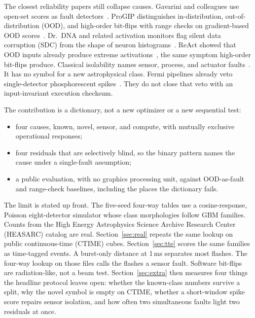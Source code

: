 \documentclass[preprint,12pt]{elsarticle}
\begin{document}
The closest reliability papers still collapse causes. Gavarini and colleagues use open-set scores as fault detectors~\cite{gavarini2022}. ProGIP distinguishes in-distribution, out-of-distribution (OOD), and high-order bit-flips with range checks on gradient-based OOD scores~\cite{progip2025}. Dr.~DNA and related activation monitors flag silent data corruption (SDC) from the shape of neuron histograms~\cite{drdna2024,geissler2023}. ReAct showed that OOD inputs already produce extreme activations~\cite{react2021}, the same symptom high-order bit-flips produce. Classical isolability names sensor, process, and actuator faults~\cite{gertler1990,venkatasubramanian2003,isermann2005}. It has no symbol for a new astrophysical class. Fermi pipelines already veto single-detector phosphorescent spikes~\cite{paciesas2012,goldstein2019,perera2025}. They do not close that veto with an input-invariant execution checksum.

The contribution is a dictionary, not a new optimizer or a new sequential test:
\begin{itemize}
\item four causes, known, novel, sensor, and compute, with mutually exclusive operational responses;
\item four residuals that are selectively blind, so the binary pattern names the cause under a single-fault assumption;
\item a public evaluation, with no graphics processing unit, against OOD-as-fault and range-check baselines, including the places the dictionary fails.
\end{itemize}

The limit is stated up front. The five-seed four-way tables use a cosine-response, Poisson eight-detector simulator whose class morphologies follow GBM families. Counts from the High Energy Astrophysics Science Archive Research Center (HEASARC) catalog are real. Section~\ref{sec:real} repeats the same lookup on \RealCubes{} public continuous-time (CTIME) cubes. Section~\ref{sec:tte} scores the same families as time-tagged events. A burst-only distance at 1\,ms separates most flashes. The four-way lookup on those files calls the flashes a sensor fault. Software bit-flips are radiation-like, not a beam test. Section~\ref{sec:extra} then measures four things the headline protocol leaves open: whether the known-class numbers survive a split, why the novel symbol is empty on CTIME, whether a short-window spike score repairs sensor isolation, and how often two simultaneous faults light two residuals at once.
\end{document}
